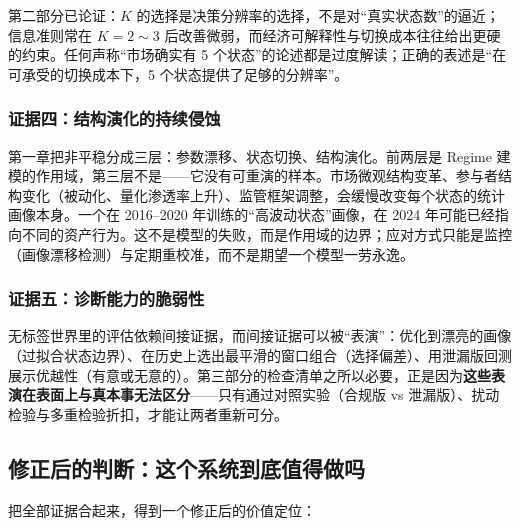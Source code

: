 第二部分已论证：$K$ 的选择是决策分辨率的选择，不是对“真实状态数”的逼近；信息准则常在 $K=2\sim3$ 后改善微弱，而经济可解释性与切换成本往往给出更硬的约束。任何声称“市场确实有 5 个状态”的论述都是过度解读；正确的表述是“在可承受的切换成本下，5 个状态提供了足够的分辨率”。

\subsubsection{证据四：结构演化的持续侵蚀}

第一章把非平稳分成三层：参数漂移、状态切换、结构演化。前两层是 Regime 建模的作用域，第三层不是——它没有可重演的样本。市场微观结构变革、参与者结构变化（被动化、量化渗透率上升）、监管框架调整，会缓慢改变每个状态的统计画像本身。一个在 2016--2020 年训练的“高波动状态”画像，在 2024 年可能已经指向不同的资产行为。这不是模型的失败，而是作用域的边界；应对方式只能是监控（画像漂移检测）与定期重校准，而不是期望一个模型一劳永逸。

\subsubsection{证据五：诊断能力的脆弱性}

无标签世界里的评估依赖间接证据，而间接证据可以被“表演”：优化到漂亮的画像（过拟合状态边界）、在历史上选出最平滑的窗口组合（选择偏差）、用泄漏版回测展示优越性（有意或无意的）。第三部分的检查清单之所以必要，正是因为\textbf{这些表演在表面上与真本事无法区分}——只有通过对照实验（合规版 vs 泄漏版）、扰动检验与多重检验折扣，才能让两者重新可分。

\subsection{修正后的判断：这个系统到底值得做吗}

把全部证据合起来，得到一个修正后的价值定位：

